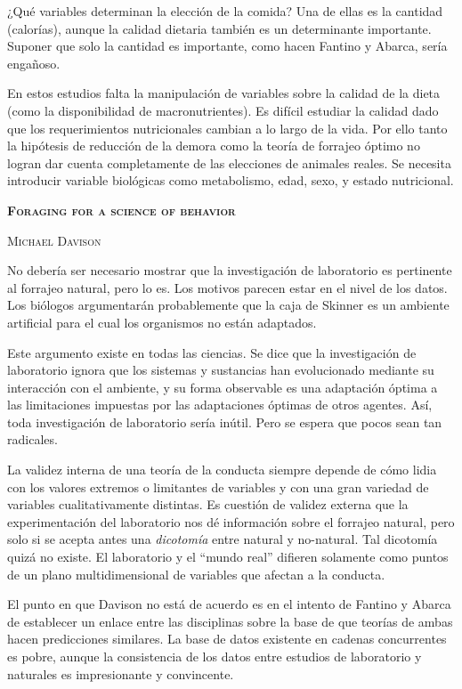 \documentclass[a4paper,12pt]{article}
\begin{document}
¿Qué variables determinan la elección de la comida? Una de ellas es la cantidad (calorías), aunque la calidad dietaria también es un determinante importante. Suponer que solo la cantidad es importante, como hacen Fantino y Abarca, sería engañoso.

En estos estudios falta la manipulación de variables sobre la calidad de la dieta (como la disponibilidad de macronutrientes). Es difícil estudiar la calidad dado que los requerimientos nutricionales cambian a lo largo de la vida. Por ello tanto la hipótesis de reducción de la demora como la teoría de forrajeo óptimo no logran dar cuenta completamente de las elecciones de animales reales. Se necesita introducir variable biológicas como metabolismo, edad, sexo, y estado nutricional.

{\scshape\bfseries Foraging for a science of behavior}

{\scshape Michael Davison}

No debería ser necesario mostrar que la investigación de laboratorio es pertinente al forrajeo natural, pero lo es. Los motivos parecen estar en el nivel de los datos. Los biólogos argumentarán probablemente que la caja de Skinner es un ambiente artificial para el cual los organismos no están adaptados.

Este argumento existe en todas las ciencias. Se dice que la investigación de laboratorio ignora que los sistemas y sustancias han evolucionado mediante su interacción con el ambiente, y su forma observable es una adaptación óptima a las limitaciones impuestas por las adaptaciones óptimas de otros agentes. Así, toda investigación de laboratorio sería inútil. Pero se espera que pocos sean tan radicales.

La validez interna de una teoría de la conducta siempre depende de cómo lidia con los valores extremos o limitantes de variables y con una gran variedad de variables cualitativamente distintas. Es cuestión de validez externa que la experimentación del laboratorio nos dé información sobre el forrajeo natural, pero solo si se acepta antes una {\itshape dicotomía} entre natural y no-natural. Tal dicotomía quizá no existe. El laboratorio y el ``mundo real'' difieren solamente como puntos de un plano multidimensional de variables que afectan a la conducta.

El punto en que Davison no está de acuerdo es en el intento de Fantino y Abarca de establecer un enlace entre las disciplinas sobre la base de que teorías de ambas hacen predicciones similares. La base de datos existente en cadenas concurrentes es pobre, aunque la consistencia de los datos entre estudios de laboratorio y naturales es impresionante y convincente. 
\end{document}
